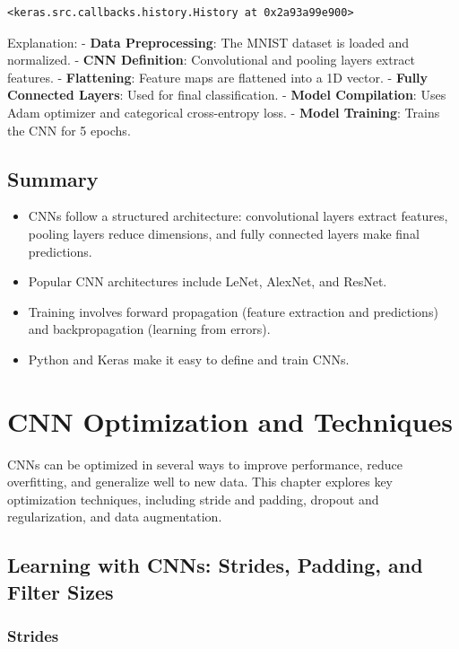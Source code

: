 \documentclass[
  letterpaper,
  DIV=11,
  numbers=noendperiod]{scrreprt}
\providecommand{\tightlist}{%
  \setlength{\itemsep}{0pt}\setlength{\parskip}{0pt}}\usepackage{longtable,booktabs,array}
\begin{document}
\begin{verbatim}
<keras.src.callbacks.history.History at 0x2a93a99e900>
\end{verbatim}

Explanation: - \textbf{Data Preprocessing}: The MNIST dataset is loaded
and normalized. - \textbf{CNN Definition}: Convolutional and pooling
layers extract features. - \textbf{Flattening}: Feature maps are
flattened into a 1D vector. - \textbf{Fully Connected Layers}: Used for
final classification. - \textbf{Model Compilation}: Uses Adam optimizer
and categorical cross-entropy loss. - \textbf{Model Training}: Trains
the CNN for 5 epochs.

\subsection{Summary}\label{summary-2}

\begin{itemize}
\tightlist
\item
  CNNs follow a structured architecture: convolutional layers extract
  features, pooling layers reduce dimensions, and fully connected layers
  make final predictions.
\item
  Popular CNN architectures include LeNet, AlexNet, and ResNet.
\item
  Training involves forward propagation (feature extraction and
  predictions) and backpropagation (learning from errors).
\item
  Python and Keras make it easy to define and train CNNs.
\end{itemize}

\section{CNN Optimization and
Techniques}\label{cnn-optimization-and-techniques}

CNNs can be optimized in several ways to improve performance, reduce
overfitting, and generalize well to new data. This chapter explores key
optimization techniques, including stride and padding, dropout and
regularization, and data augmentation.

\subsection{Learning with CNNs: Strides, Padding, and Filter
Sizes}\label{learning-with-cnns-strides-padding-and-filter-sizes}

\subsubsection{Strides}\label{strides}
\end{document}
